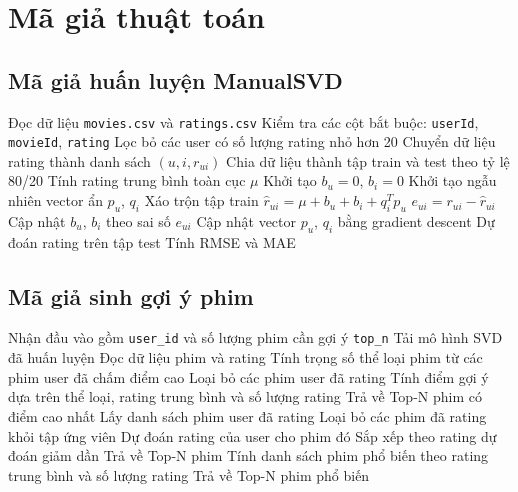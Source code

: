 \documentclass[12pt,a4paper]{article}
\begin{document}
\section{Mã giả thuật toán}

\subsection{Mã giả huấn luyện ManualSVD}

\begin{algorithm}[H]
\caption{Huấn luyện SVD thủ công bằng SGD}
\begin{algorithmic}[1]
\State Đọc dữ liệu \texttt{movies.csv} và \texttt{ratings.csv}
\State Kiểm tra các cột bắt buộc: \texttt{userId}, \texttt{movieId}, \texttt{rating}
\State Lọc bỏ các user có số lượng rating nhỏ hơn 20
\State Chuyển dữ liệu rating thành danh sách \((u, i, r_{ui})\)
\State Chia dữ liệu thành tập train và test theo tỷ lệ 80/20
\State Tính rating trung bình toàn cục \(\mu\)
    \State Khởi tạo \(b_u = 0\), \(b_i = 0\)
    \State Khởi tạo ngẫu nhiên vector ẩn \(p_u\), \(q_i\)
\EndFor
{}
    \State Xáo trộn tập train
        \State \(\hat{r}_{ui} = \mu + b_u + b_i + q_i^T p_u\)
        \State \(e_{ui} = r_{ui} - \hat{r}_{ui}\)
        \State Cập nhật \(b_u\), \(b_i\) theo sai số \(e_{ui}\)
        \State Cập nhật vector \(p_u\), \(q_i\) bằng gradient descent
    \EndFor
\EndFor
\State Dự đoán rating trên tập test
\State Tính RMSE và MAE
\end{algorithmic}
\end{algorithm}

\subsection{Mã giả sinh gợi ý phim}

\begin{algorithm}[H]
\caption{Gợi ý phim cho người dùng}
\begin{algorithmic}[1]
\State Nhận đầu vào gồm \texttt{user\_id} và số lượng phim cần gợi ý \texttt{top\_n}
\State Tải mô hình SVD đã huấn luyện
\State Đọc dữ liệu phim và rating
    \State Tính trọng số thể loại phim từ các phim user đã chấm điểm cao
    \State Loại bỏ các phim user đã rating
    \State Tính điểm gợi ý dựa trên thể loại, rating trung bình và số lượng rating
    \State Trả về Top-N phim có điểm cao nhất
    \State Lấy danh sách phim user đã rating
    \State Loại bỏ các phim đã rating khỏi tập ứng viên
        \State Dự đoán rating của user cho phim đó
    \EndFor
    \State Sắp xếp theo rating dự đoán giảm dần
    \State Trả về Top-N phim
\Else
    \State Tính danh sách phim phổ biến theo rating trung bình và số lượng rating
    \State Trả về Top-N phim phổ biến
\EndIf
\end{algorithmic}
\end{algorithm}
\end{document}
